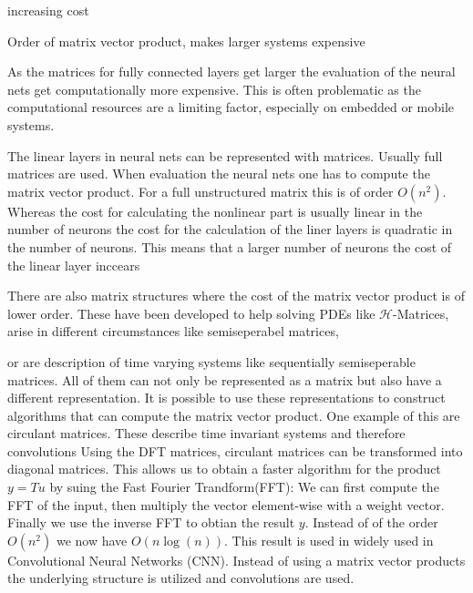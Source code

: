 \documentclass[doctype=mastersthesis,BCOR=15mm,biblatex]{ldvbook}%
\newcommand{\bigO}{O}
\begin{document}
increasing cost

Order of matrix vector product, makes larger systems expensive


As the matrices for fully connected layers get larger the evaluation of the neural nets get computationally more expensive. This is often problematic as the computational resources are a limiting factor, especially on embedded or mobile systems.


The linear layers in neural nets can be represented with matrices.
Usually full matrices are used.
When evaluation the neural nets one has to compute the matrix vector product.
For a full unstructured matrix this is of order $O(n^2)$. 
Whereas the cost for calculating the nonlinear part is usually linear in the number of neurons the cost for the calculation of the liner layers is quadratic in the number of neurons.
This means that a larger number of neurons the cost of the linear layer inccears 


There are also matrix structures where the cost of the matrix vector product is of lower order.
These have been developed to help solving PDEs like $\mathcal{H}$-Matrices, arise in different circumstances like semiseperabel matrices, %

or are description of time varying systems like sequentially semiseperable matrices.
All of them can not only be represented as a matrix but also have a different representation.
It is possible to use these representations to construct algorithms that can compute the matrix vector product.
One example of this are circulant matrices. 
These describe time invariant systems and therefore convolutions 
Using the DFT matrices, circulant matrices can be transformed into diagonal matrices.
This allows us to obtain a faster algorithm for the product $y=Tu$ by suing the Fast Fourier Trandform(FFT):
We can first compute the FFT of the input, then multiply the vector element-wise with a weight vector. Finally we use the inverse FFT to obtian the result $y$.
Instead of of the order $\bigO(n^2)$ we now have $\bigO(n\log(n))$.
This result is used in widely used in Convolutional Neural Networks (CNN).
Instead of using a matrix vector products the underlying structure is utilized and convolutions are used.
\end{document}
